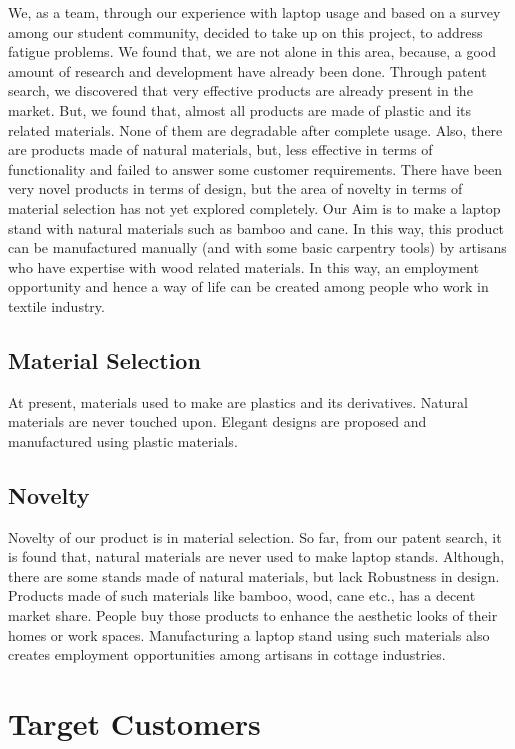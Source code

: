 We, as a team, through our experience with laptop usage and based on a survey among our student community, decided to take up on this project, to address fatigue problems. We found that, we are not alone in this area,  because, a good amount of research and development have already been done. Through patent search, we discovered that very effective products are already present in the market. But, we found that, almost all products are made of plastic and its related materials. None of them are degradable after complete usage. Also, there are products made of natural materials, but, less effective in terms of functionality and failed to answer some customer requirements. There have been very novel products in terms of design, but the area of novelty in terms of  material selection has not yet explored completely. Our Aim is to make a laptop stand with natural materials such as bamboo and cane. In this way, this product can be manufactured manually (and with some basic carpentry tools) by artisans who have expertise with wood related materials. In this way, an employment opportunity and hence a way of life can be created among people who work in textile industry.

\section{Material Selection}

At present, materials used to make are plastics and its derivatives. Natural materials are never touched upon. Elegant designs are proposed and manufactured using plastic materials.

\section{Novelty}

Novelty of our product is in material selection. So far, from our patent search, it is found that, natural materials are never used to make laptop stands. Although, there are some stands made of natural materials, but lack Robustness in design. Products made of such materials like bamboo, wood, cane etc., has a decent market share. People buy those products to enhance the aesthetic looks of their homes or work spaces. Manufacturing a laptop stand using such materials also creates employment opportunities among artisans in cottage industries\cite{Pinterest}.

\chapter{Target Customers}

